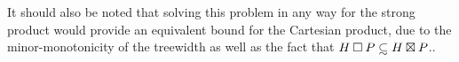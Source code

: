 \documentclass[../main.tex]{subfiles}
\begin{document}
	It should also be noted that solving this problem in any way for the strong product would provide an equivalent bound for the Cartesian product, due to the minor-monotonicity of the treewidth as well as the fact that $H\boxprod P \subsetsim H\boxtimes P$.. 
	
	
	
\end{document}

